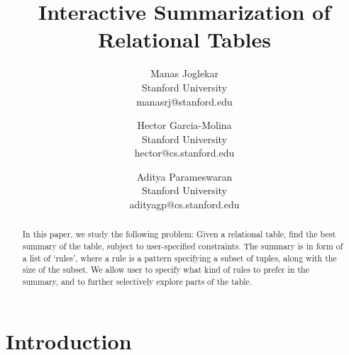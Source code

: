 \documentclass{sig-alternate}
\title{Interactive Summarization of Relational Tables}
\author{
Manas Joglekar\\Stanford University\\manasrj@stanford.edu
\and
Hector Garcia-Molina\\Stanford University\\hector@cs.stanford.edu
\and
Aditya Parameswaran\\Stanford University\\adityagp@cs.stanford.edu
}
\begin{document}
\maketitle

\begin{abstract}
In this paper, we study the following problem: Given a relational table, find the best summary of the table, subject to user-specified constraints. The summary is in form of a list of `rules', where a rule is a pattern specifying a subset of tuples, along with the size of the subset. We allow user to specify what kind of rules to prefer in the summary, and to further selectively explore parts of the table.
\end{abstract}


\begin{comment}
Meeting points:

\end{comment}

\section{Introduction}

\end{document}

